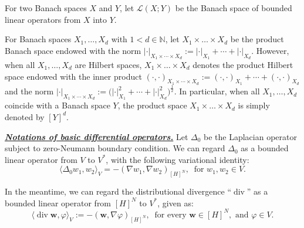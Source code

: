 \documentclass{sinst}
\numberwithin{equation}{section}
\theoremstyle{plain}
\theoremstyle{definition}
\def\N{\mathbb{N}}
\def\Lap{\mathit{\Delta}}
\DeclareMathOperator{\diver}{div}
\begin{document}
For two Banach spaces $ X $ and $ Y $,  let $  \mathscr{L}(X; Y)$ be the Banach space of bounded linear operators from $ X $ into $ Y $. 

For Banach spaces $ X_1, \dots, X_d $ with $ 1 < d \in \N $, let $ X_1 \times \dots \times X_d $ be the product Banach space endowed with the norm $ |\cdot|_{X_1 \times \cdots \times X_d} := |\cdot|_{X_1} + \cdots +|\cdot|_{X_d} $. However, when all $ X_1, \dots, X_d $ are Hilbert spaces, $ X_1 \times \dots \times X_d $ denotes the product Hilbert space endowed with the inner product $ (\cdot, \cdot)_{X_1 \times \cdots \times X_d} := (\cdot, \cdot)_{X_1} + \cdots +(\cdot, \cdot)_{X_d} $ and the norm $ |\cdot|_{X_1 \times \cdots \times X_d} := \bigl( |\cdot|_{X_1}^2 + \cdots +|\cdot|_{X_d}^2 \bigr)^{\frac{1}{2}} $. In particular, when all $ X_1, \dots,  X_d $ coincide with a Banach space $ Y $, the product space $X_1 \times \dots \times X_d$ is simply denoted by $[Y]^d$.
\bigskip

\noindent
\underline{\textbf{\textit{Notations of basic differential operators.}}}
Let $\Lap_0$ be the Laplacian operator subject to zero-Neumann boundary condition. We can regard $\Lap_0$ as a bounded linear operator from $V$ to $V^*$, with the following variational identity:
\begin{equation}
    \langle \Lap_0 w_1, w_2 \rangle_V = -(\nabla w_1, \nabla w_2)_{[H]^N}, \ \mbox{ for } w_1, w_2 \in V.
\end{equation}

In the meantime, we can regard the distributional divergence ``$\diver$'' as a bounded linear operator from $[H]^N$ to $V^*$, given as:
\begin{equation}
    \langle \diver {\bm w}, \varphi \rangle_V := -({\bm w}, \nabla \varphi)_{[H]^N}, \ \mbox{ for every } {\bm w} \in [H]^N, \mbox{ and } \varphi \in V.
\end{equation}

\smallskip
\end{document}
